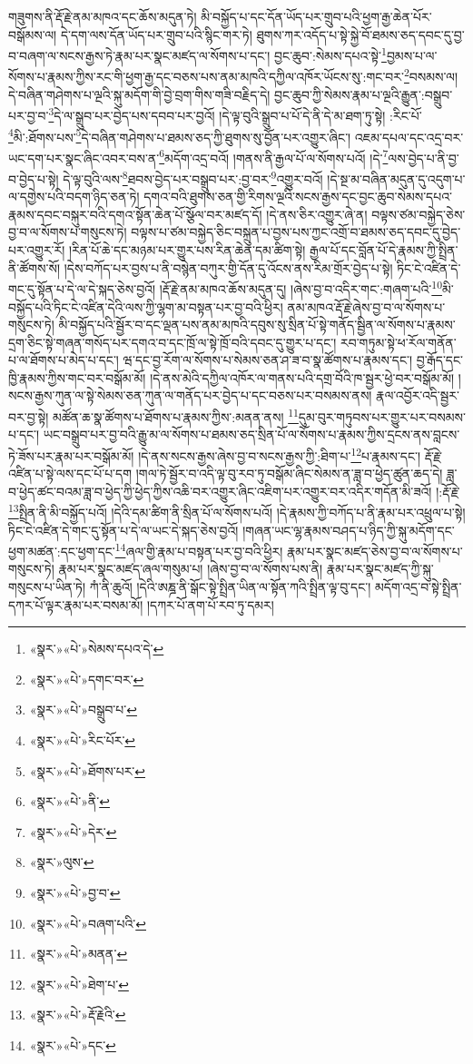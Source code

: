 གཟུགས་ནི་རྡོ་རྗེ་ནམ་མཁའ་དང་ཆོས་མདུན་ཏེ། མི་བསྐྱོད་པ་དང་དོན་ཡོད་པར་གྲུབ་པའི་ཕྱག་རྒྱ་ཆེན་པོར་བསྒོམས་ལ། དེ་དག་ལས་དོན་ཡོད་པར་གྲུབ་པའི་སྙིང་གར་ཏེ། ཐུགས་ཀར་འདོད་པ་སྟེ་སྐྱེ་བོ་ཐམས་ཅད་དབང་དུ་བྱ་བ་བཞག་ལ་སངས་རྒྱས་ཏེ་རྣམ་པར་སྣང་མཛད་ལ་སོགས་པ་དང་། བྱང་ཆུབ་:སེམས་དཔའ་སྟེ་\footnote{«སྣར་»«པེ་»སེམས་དཔའ་དེ་}བྱམས་པ་ལ་སོགས་པ་རྣམས་ཀྱིས་རང་གི་ཕྱག་རྒྱ་དང་བཅས་པས་ནམ་མཁའི་དཀྱིལ་འཁོར་ཡོངས་སུ་:གང་བར་\footnote{«སྣར་»«པེ་»དགང་བར་}བསམས་ལ། དེ་བཞིན་གཤེགས་པ་ལྔའི་སྐུ་མདོག་གི་བྱེ་བྲག་གིས་གཟི་བརྗིད་དེ། བྱང་ཆུབ་ཀྱི་སེམས་རྣམ་པ་ལྔའི་རྒྱུན་:བསྒྲུབ་པར་བྱ་བ་\footnote{«སྣར་»«པེ་»བསྒྲུབ་པ་}དེ་ལ་སྒྲུབ་པར་བྱེད་པས་དབབ་པར་བྱའོ། །དེ་ལྟ་བུའི་སྒྲུབ་པ་པོ་དེ་ནི་དེ་མ་ཐག་ཏུ་སྟེ། :རིང་པོ་\footnote{«སྣར་»«པེ་»རིང་པོར་}མི་:ཐོགས་པས་\footnote{«སྣར་»«པེ་»ཐོགས་པར་}དེ་བཞིན་གཤེགས་པ་ཐམས་ཅད་ཀྱི་ཐུགས་སུ་བྱོན་པར་འགྱུར་ཞིང་། འཇམ་དཔལ་དང་འདྲ་བར་ཡང་དག་པར་སྣང་ཞིང་འབར་བས་ན་\footnote{«སྣར་»«པེ་»ནི་}མདོག་འདྲ་བའོ། །གནས་ནི་རྒྱལ་པོ་ལ་སོགས་པའོ། །དེ་\footnote{«སྣར་»«པེ་»དེར་}ལས་བྱེད་པ་ནི་བྱ་བ་བྱེད་པ་སྟེ། དེ་ལྟ་བུའི་ལས་\footnote{«སྣར་»ལུས་}ཐབས་བྱེད་པར་བསྒྲུབ་པར་:བྱ་བར་\footnote{«སྣར་»«པེ་»བྱ་བ་}འགྱུར་བའོ། །དེ་སྔ་མ་བཞིན་མདུན་དུ་འདུག་པ་ལ་དགྱེས་པའི་བདག་ཉིད་ཅན་ཏེ། དགའ་བའི་ཐུགས་ཅན་གྱི་རིགས་ལྔའི་སངས་རྒྱས་དང་བྱང་ཆུབ་སེམས་དཔའ་རྣམས་དབང་བསྐུར་བའི་དགའ་སྟོན་ཆེན་པོ་སྩོལ་བར་མཛད་དོ། །དེ་ནས་ཅིར་འགྱུར་ཞེ་ན། བལྟས་ཙམ་བསྐྱེད་ཅེས་བྱ་བ་ལ་སོགས་པ་གསུངས་ཏེ། བལྟས་པ་ཙམ་བསྐྱེད་ཅིང་བསྐྲུན་པ་བྱས་པས་ཀྱང་འགྲོ་བ་ཐམས་ཅད་དབང་དུ་བྱེད་པར་འགྱུར་རོ། །རིན་པོ་ཆེ་དང་མཉམ་པར་གྱུར་པས་རིན་ཆེན་དམ་ཚིག་སྟེ། རྒྱལ་པོ་དང་བློན་པོ་དེ་རྣམས་ཀྱི་སྤྲིན་ནི་ཚོགས་སོ། །དེས་བཀོད་པར་བྱས་པ་ནི་བསྙེན་བཀུར་གྱི་དོན་དུ་འོངས་ནས་རིམ་གྲོར་བྱེད་པ་སྟེ། ཏིང་ངེ་འཛིན་དེ་གང་དུ་སྟོན་པ་དེ་ལ་དེ་སྐད་ཅེས་བྱའོ། །རྡོ་རྗེ་ནམ་མཁའ་ཆོས་མདུན་དུ། །ཞེས་བྱ་བ་འདིར་གང་:གཞག་པའི་\footnote{«སྣར་»«པེ་»བཞག་པའི་}མི་བསྐྱོད་པའི་ཏིང་ངེ་འཛིན་དེའི་ལས་ཀྱི་ལྷག་མ་བསྟན་པར་བྱ་བའི་ཕྱིར། ནམ་མཁའ་རྡོ་རྗེ་ཞེས་བྱ་བ་ལ་སོགས་པ་གསུངས་ཏེ། མི་བསྐྱོད་པའི་སྦྱོར་བ་དང་ལྡན་པས་ནམ་མཁའི་དབུས་སུ་སྲིན་པོ་སྟེ་གནོད་སྦྱིན་ལ་སོགས་པ་རྣམས་དྲག་ཅིང་སྟེ་གཞན་གསོད་པར་དགའ་བ་དང་ཁྲོ་ལ་སྟེ་ཁྲོ་བའི་དབང་དུ་གྱུར་པ་དང་། རབ་གཏུམ་སྟེ་ཕ་རོལ་གནོན་པ་ལ་ཐོགས་པ་མེད་པ་དང་། ཝ་དང་བྱ་རོག་ལ་སོགས་པ་སེམས་ཅན་ཤ་ཟ་བ་སྣ་ཚོགས་པ་རྣམས་དང་། བྱ་རྒོད་དང་ཁྱི་རྣམས་ཀྱིས་གང་བར་བསྒོམ་མོ། །དེ་ནས་མེའི་དཀྱིལ་འཁོར་ལ་གནས་པའི་དགྲ་བོའི་ཁ་སྦྱར་ཕྱེ་བར་བསྒོམ་མོ། །སངས་རྒྱས་ཀུན་ལ་སྟེ་སེམས་ཅན་ཀུན་ལ་གནོད་པར་བྱེད་པ་དང་བཅས་པར་བསམས་ནས། རྣལ་འབྱོར་འདི་སྦྱར་བར་བྱ་སྟེ། མཚོན་ཆ་སྣ་ཚོགས་པ་ཐོགས་པ་རྣམས་ཀྱིས་:མནན་ནས། \footnote{«སྣར་»«པེ་»མནན་}དུམ་བུར་གཏུབས་པར་གྱུར་པར་བསམས་པ་དང་། ཡང་བསྒྲུབ་པར་བྱ་བའི་རྒྱུ་མ་ལ་སོགས་པ་ཐམས་ཅད་སྲིན་པོ་ལ་སོགས་པ་རྣམས་ཀྱིས་དྲངས་ནས་བླངས་ཏེ་ཟོས་པར་རྣམ་པར་བསྒོམ་མོ། །དེ་ནས་སངས་རྒྱས་ཞེས་བྱ་བ་སངས་རྒྱས་ཀྱི་:ཐིག་པ་\footnote{«སྣར་»«པེ་»ཐེག་པ་}པ་རྣམས་དང་། རྡོ་རྗེ་འཛིན་པ་སྟེ་ལས་དང་པོ་པ་དག །གལ་ཏེ་སྦྱོར་བ་འདི་ལྟ་བུ་རབ་ཏུ་བསྒོམ་ཞིང་སེམས་ན་ཟླ་བ་ཕྱེད་ཚུན་ཆད་དེ། ཟླ་བ་ཕྱེད་ཚང་བའམ་ཟླ་བ་ཕྱེད་ཀྱི་ཕྱེད་ཀྱིས་འཆི་བར་འགྱུར་ཞིང་འཇིག་པར་འགྱུར་བར་འདིར་གདོན་མི་ཟའོ། །:རྡོ་རྗེ་\footnote{«སྣར་»«པེ་»རྡོ་རྗེའི་}སྤྲིན་ནི་མི་བསྐྱོད་པའོ། །དེའི་དམ་ཚིག་ནི་སྲིན་པོ་ལ་སོགས་པའོ། །དེ་རྣམས་ཀྱི་བཀོད་པ་ནི་རྣམ་པར་འཕྲུལ་པ་སྟེ། ཏིང་ངེ་འཛིན་དེ་གང་དུ་སྟོན་པ་དེ་ལ་ཡང་དེ་སྐད་ཅེས་བྱའོ། །གཞན་ཡང་ལྷ་རྣམས་བཤད་པ་ཉིད་ཀྱི་སྐུ་མདོག་དང་ཕྱག་མཚན་:དང་ཕྱག་དང་\footnote{«སྣར་»«པེ་»དང་}ཞལ་གྱི་རྣམ་པ་བསྟན་པར་བྱ་བའི་ཕྱིར། རྣམ་པར་སྣང་མཛད་ཅེས་བྱ་བ་ལ་སོགས་པ་གསུངས་ཏེ། རྣམ་པར་སྣང་མཛད་ཞལ་གསུམ་པ། །ཞེས་བྱ་བ་ལ་སོགས་པས་ནི། རྣམ་པར་སྣང་མཛད་ཀྱི་སྐུ་གསུངས་པ་ཡིན་ཏེ། ཀཾ་ནི་ཆུའོ། །དེའི་ཨཎྜ་ནི་སྒོང་སྟེ་སྤྲིན་ཡིན་ལ་སྟོན་ཀའི་སྤྲིན་ལྟ་བུ་དང་། མདོག་འདྲ་བ་སྟེ་སྤྲིན་དཀར་པོ་ལྟར་རྣམ་པར་བསམ་མོ། །དཀར་པོ་ནག་པོ་རབ་ཏུ་དམར། 